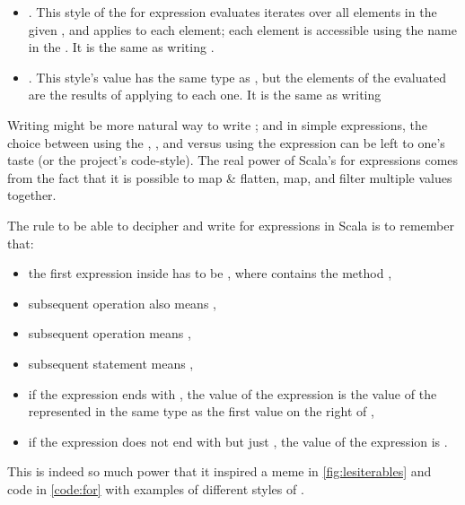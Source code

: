 \documentclass[10 pt]{article}
\begin{document}
\begin{itemize}
  \item {}. This style of the for expression evaluates iterates over all elements in the given , and applies  to each element; each element is accessible using the name  in the . It is the same as writing .
  \item {}. This style's value has the same type as , but the elements of the evaluated  are the results of applying  to each one. It is the same as writing 
\end{itemize}

Writing  might be more natural way to write ; and in simple expressions, the choice between using the , , and  versus using the  expression can be left to one's taste (or the project's code-style). The real power of Scala's for expressions comes from the fact that it is possible to map \& flatten, map, and filter multiple values together. 

The rule to be able to decipher and write for expressions in Scala is to remember that:

\begin{itemize}
  \item the first expression inside  has to be , where  contains the method ,
  \item subsequent \pcode{<-} operation also means ,
  \item subsequent \pcode{=} operation means ,
  \item subsequent  statement means ,
  \item if the expression ends with , the value of the  expression is the value of the represented in the same type as the first value on the right of \pcode{<-},
  \item if the expression does not end with  but just , the value of the  expression is .
\end{itemize}

This is indeed so much power that it inspired a meme in \autoref{fig:lesiterables} and code in \autoref{code:for} with examples of different styles of .
\end{document}
